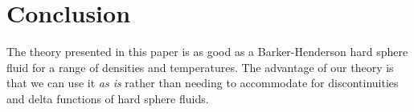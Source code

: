\documentclass[letterpaper,twocolumn,amsmath,amssymb,prb]{revtex4-1}
\begin{document}
\[{}\]
\[{}\]
\[{}\]



\section{Conclusion}

The theory presented in this paper is as good as a Barker-Henderson
hard sphere fluid for a range of densities and temperatures. The
advantage of our theory is that we can use it \emph{as is} rather than
needing to accommodate for discontinuities and delta functions of hard
sphere fluids.

\[{}\]
\[{}\]
\[{}\]
\[{}\]
\[{}\]
\[{}\]
\[{}\]
\[{}\]
\[{}\]
\[{}\]
\[{}\]
\[{}\]
\[{}\]
\[{}\]
\[{}\]
\[{}\]
\[{}\]
\[{}\]
\[{}\]
\[{}\]
\[{}\]
\[{}\]
\[{}\]
\[{}\]
\[{}\]
\[{}\]
\[{}\]
\[{}\]
\[{}\]
\[{}\]
\[{}\]
\[{}\]
\[{}\]
\[{}\]
\[{}\]
\[{}\]
\[{}\]
\[{}\]
\[{}\]
\[{}\]
\[{}\]
\[{}\]
\[{}\]
\[{}\]
\[{}\]
\[{}\]
\[{}\]
\[{}\]

 
\end{document}
